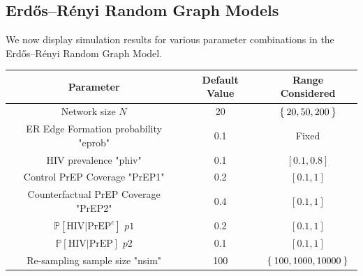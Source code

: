 \documentclass{article}
\theoremstyle{definition}
\begin{document}
\subsection{Erdős–Rényi  Random Graph Models}
We now display simulation results for various parameter combinations in the Erdős–Rényi Random Graph Model.
\begin{center}
    \begin{tabular}{|c|c|c|}
    \hline
         Parameter & Default Value & Range Considered  \\
         \hline
         Network size $N$& 20 & $\Set{20,50,200}$\\
         \hline
         ER Edge Formation probability "eprob" & 0.1 & Fixed \\
         \hline
         HIV prevalence "phiv" & 0.1 & $[0.1,0.8]$\\
         \hline
         Control PrEP Coverage "PrEP1" & 0.2 & $[0.1,1]$\\
         \hline
         Counterfactual PrEP Coverage "PrEP2" & 0.4 & $[0.1,1]$\\
         \hline
         $\mathbb{P}\left[\text{HIV} \vert \text{PrEP}^{c}\right]$ $p1$ & 0.2 & $[0.1,1]$\\
         \hline
         $\mathbb{P}\left[\text{HIV} \vert \text{PrEP}\right]$ $p2$ & 0.1 & $[0.1,1]$\\
         \hline
         Re-sampling sample size "nsim" & 100 & $\Set{100,1000,10000}$\\
         \hline
    \end{tabular}
\end{center}
\end{document}

